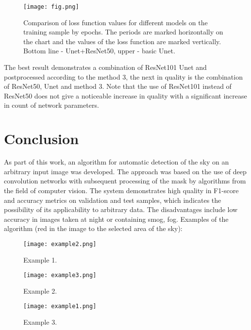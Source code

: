 \documentclass[runningheads]{llncs}
\begin{document}
\begin{figure}[H]
\texttt{[image: fig.png]}
\caption{Comparison of loss function values for different models on the training sample by epochs. The periods are marked horizontally on the chart and the values of the loss function are marked vertically. Bottom line - Unet+ResNet50, upper - basic Unet.} \label{fig2}
\end{figure}

The best result demonstrates a combination of ResNet101 Unet and postprocessed according to the method 3, the next in quality is the combination of ResNet50, Unet and method 3. Note that the use of ResNet101 instead of ResNet50 does not give a noticeable increase in quality with a significant increase in count of network parameters.


\section{Conclusion}
As part of this work, an algorithm for automatic detection of the sky on an arbitrary input image was developed. The approach was based on the use of deep convolution networks with subsequent processing of the mask by algorithms from the field of computer vision.  The system demonstrates high quality in F1-score and accuracy metrics on validation and test samples, which indicates the possibility of its applicability to arbitrary data. The disadvantages include low accuracy in images taken at night or containing smog, fog. Examples of the algorithm (red in the image to the selected area of the sky):

\begin{figure}[H]
\begin{minipage}[b]{0.4\textwidth}
    \centering\texttt{[image: example2.png]}
    \caption{Example 1.}
\end{minipage}
\begin{minipage}[b]{0.4\textwidth}
    \centering\texttt{[image: example3.png]}
    \caption{Example 2.}
\end{minipage}
\begin{minipage}[b]{0.4\textwidth}
    \centering\texttt{[image: example1.png]}
    \caption{Example 3.}
\end{minipage}
\end{figure}
%
%
%
% 
% 
%
\end{document}
